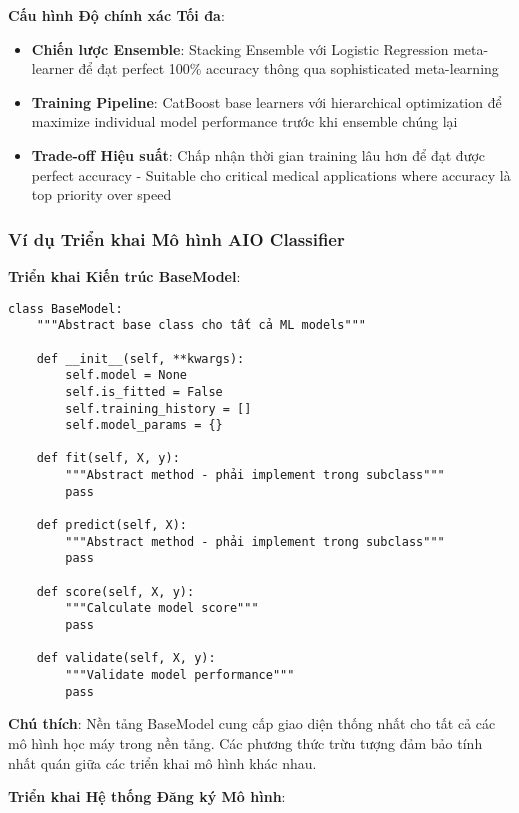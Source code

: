 \textbf{Cấu hình Độ chính xác Tối đa}:
\begin{itemize}
    \item \textbf{Chiến lược Ensemble}: Stacking Ensemble với Logistic Regression meta-learner để đạt perfect 100\% accuracy thông qua sophisticated meta-learning
    \item \textbf{Training Pipeline}: CatBoost base learners với hierarchical optimization để maximize individual model performance trước khi ensemble chúng lại
    \item \textbf{Trade-off Hiệu suất}: Chấp nhận thời gian training lâu hơn để đạt được perfect accuracy - Suitable cho critical medical applications where accuracy là top priority over speed
\end{itemize}

\subsubsection{Ví dụ Triển khai Mô hình AIO Classifier}

\textbf{Triển khai Kiến trúc BaseModel}:

\begin{verbatim}
class BaseModel:
    """Abstract base class cho tất cả ML models"""
    
    def __init__(self, **kwargs):
        self.model = None
        self.is_fitted = False
        self.training_history = []
        self.model_params = {}
        
    def fit(self, X, y):
        """Abstract method - phải implement trong subclass"""
        pass
        
    def predict(self, X):
        """Abstract method - phải implement trong subclass"""
        pass
        
    def score(self, X, y):
        """Calculate model score"""
        pass
        
    def validate(self, X, y):
        """Validate model performance"""
        pass
\end{verbatim}

\textbf{Chú thích}: Nền tảng BaseModel cung cấp giao diện thống nhất cho tất cả các mô hình học máy trong nền tảng. Các phương thức trừu tượng đảm bảo tính nhất quán giữa các triển khai mô hình khác nhau.

\textbf{Triển khai Hệ thống Đăng ký Mô hình}:

